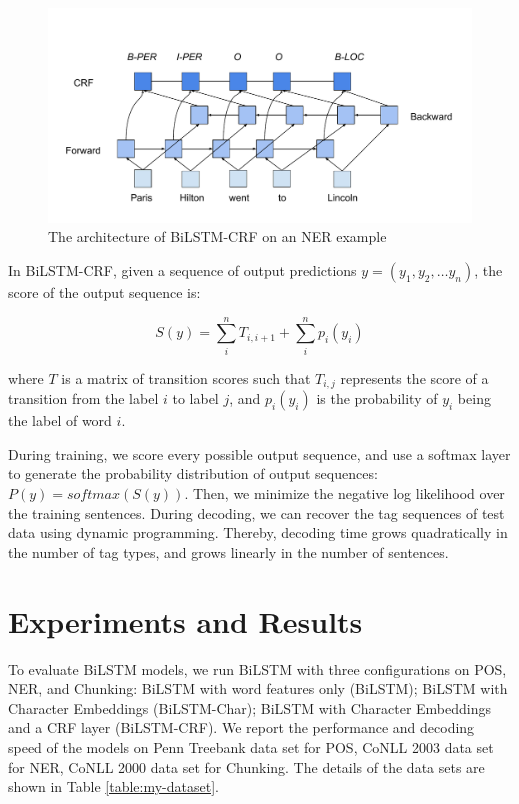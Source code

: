 \begin{figure}
  \centering
  \includegraphics[scale=0.6]{bilstmcrf}
 \caption{The architecture of BiLSTM-CRF on an NER example}
  \label{fig:bilstmcrf}
\end{figure}

In BiLSTM-CRF, given a sequence of output predictions $y=\left( y_{1},y_{2},\ldots y_{n}\right)$, the score of the output sequence is:

\begin{equation}
S\left( y\right)=\sum _{i}^{n}T_{i,i+1}+\sum _{i}^{n}p_{i}\left(y_{i}\right)
\end{equation}

\noindent
where $T$ is a matrix of transition scores such that $T_{i,j}$ represents the score of a transition from the label $i$ to label $j$, and $p_{i}\left(y_{i}\right)$ is the probability of $y_{i}$ being the label of word $i$.

During training, we score every possible output sequence, and use a softmax layer to generate the probability distribution of output sequences: $P\left( y\right) = \textit{softmax}(S\left( y\right))$. Then, we minimize the negative log likelihood over the training sentences. During decoding, we can recover the tag sequences of test data using dynamic programming. Thereby, decoding time grows quadratically in the number of tag types, and grows linearly in the number of sentences.

\section{Experiments and Results}

To evaluate BiLSTM models, we run BiLSTM with three configurations on POS, NER, and Chunking: BiLSTM with word features only (BiLSTM); BiLSTM with Character Embeddings (BiLSTM-Char); BiLSTM with Character Embeddings and a CRF layer (BiLSTM-CRF). We report the performance and decoding speed of the models on Penn Treebank data set for POS, CoNLL 2003 data set for NER, CoNLL 2000 data set for Chunking. The details of the data sets are shown in Table \ref{table:my-dataset}.

